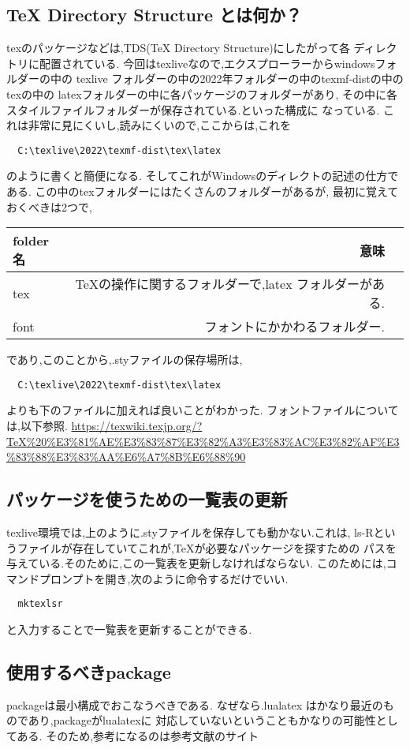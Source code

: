 \documentclass{ltjsarticle}
\begin{document}
\subsection{TeX Directory Structure とは何か？}
texのパッケージなどは,TDS(TeX Directory Structure)にしたがって各
ディレクトリに配置されている.
今回はtexliveなので,エクスプローラーからwindowsフォルダーの中の
texlive フォルダーの中の2022年フォルダーの中のtexmf-distの中のtexの中の
latexフォルダーの中に各パッケージのフォルダーがあり,
その中に各スタイルファイルフォルダーが保存されている.といった構成に
なっている.
これは非常に見にくいし,読みにくいので,ここからは,これを
\begin{verbatim}
  C:\texlive\2022\texmf-dist\tex\latex
\end{verbatim}
のように書くと簡便になる.
そしてこれがWindowsのディレクトの記述の仕方である.
この中のtexフォルダーにはたくさんのフォルダーがあるが,
最初に覚えておくべきは2つで,
\begin{center}
  \begin{tabular}{lrr} \hline
    folder名 & 意味                               \\ \hline
    tex     & TeXの操作に関するフォルダーで,latex フォルダーがある. \\
    font    & フォントにかかわるフォルダー.                  \\ \hline
  \end{tabular}
\end{center}
であり,このことから,.styファイルの保存場所は,
\begin{verbatim}
  C:\texlive\2022\texmf-dist\tex\latex
\end{verbatim}
よりも下のファイルに加えれば良いことがわかった.
フォントファイルについては,以下参照.
\url{https://texwiki.texjp.org/?TeX%20%E3%81%AE%E3%83%87%E3%82%A3%E3%83%AC%E3%82%AF%E3%83%88%E3%83%AA%E6%A7%8B%E6%88%90}
\subsection{パッケージを使うための一覧表の更新}
texlive環境では,上のように.styファイルを保存しても動かない.これは,
ls-Rというファイルが存在していてこれが,TeXが必要なパッケージを探すための
パスを与えている.そのために,この一覧表を更新しなければならない.
このためには,コマンドプロンプトを開き,次のように命令するだけでいい.
\begin{verbatim}
  mktexlsr
\end{verbatim}
と入力することで一覧表を更新することができる.
\subsection{使用するべきpackage}
packageは最小構成でおこなうべきである.
なぜなら.lualatex  はかなり最近のものであり,packageがlualatexに
対応していないということもかなりの可能性としてある.
そのため,参考になるのは参考文献のサイト
\end{document}
